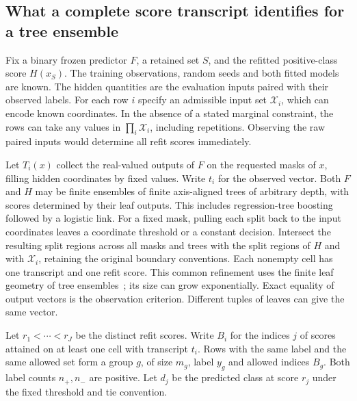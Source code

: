 \subsection{What a complete score transcript identifies for a tree ensemble}
\label{sec:ensemble-identification}
Fix a binary frozen predictor $F$, a retained set $S$, and the refitted positive-class score $H(x_S)$. The training observations, random seeds and both fitted models are known. The hidden quantities are the evaluation inputs paired with their observed labels. For each row $i$ specify an admissible input set $\mathcal X_i$, which can encode known coordinates. In the absence of a stated marginal constraint, the rows can take any values in $\prod_i\mathcal X_i$, including repetitions. Observing the raw paired inputs would determine all refit scores immediately.

Let $T_i(x)$ collect the real-valued outputs of $F$ on the requested masks of $x$, filling hidden coordinates by fixed values. Write $t_i$ for the observed vector. Both $F$ and $H$ may be finite ensembles of finite axis-aligned trees of arbitrary depth, with scores determined by their leaf outputs. This includes regression-tree boosting followed by a logistic link. For a fixed mask, pulling each split back to the input coordinates leaves a coordinate threshold or a constant decision. Intersect the resulting split regions across all masks and trees with the split regions of $H$ and with $\mathcal X_i$, retaining the original boundary conventions. Each nonempty cell has one transcript and one refit score. This common refinement uses the finite leaf geometry of tree ensembles~\cite{misic2020ensemble}; its size can grow exponentially. Exact equality of output vectors is the observation criterion. Different tuples of leaves can give the same vector.

Let $r_1<\cdots<r_J$ be the distinct refit scores. Write $B_i$ for the indices $j$ of scores attained on at least one cell with transcript $t_i$. Rows with the same label and the same allowed set form a group $g$, of size $m_g$, label $y_g$ and allowed indices $B_g$. Both label counts $n_+,n_-$ are positive. Let $d_j$ be the predicted class at score $r_j$ under the fixed threshold and tie convention.

